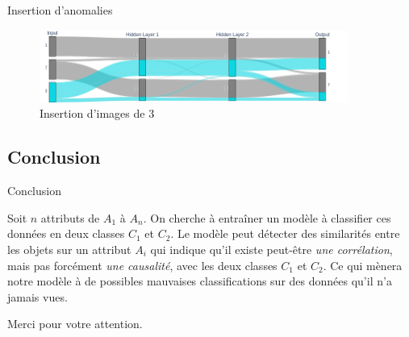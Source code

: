 \documentclass[10pt,handout]{beamer}
\begin{document}
\begin{frame}{Insertion d’anomalies}
    \begin{figure}[h]
        \centering
        \includegraphics[width=0.9\textwidth]{img/anomalie3_sankey.png}
        \caption{Insertion d’images de 3}
    \end{figure}
\end{frame}

\subsection{Conclusion}
\begin{frame}{Conclusion}
    \begin{block}{}
        Soit $n$ attributs de $A_1$ à $A_n$. On cherche à entraîner un modèle à classifier ces données en deux classes $C_1$ et $C_2$. Le modèle peut détecter des similarités entre les objets sur un attribut $A_i$ qui indique qu'il existe peut-être \textit{une corrélation}, mais pas forcément \textit{une causalité}, avec les deux classes $C_1$ et $C_2$. Ce qui mènera notre modèle à de possibles mauvaises classifications sur des données qu'il n'a jamais vues.
    \end{block}
\end{frame}


\begin{frame}
    \begin{center}
      Merci pour votre attention.
    \end{center}
\end{frame}
  
\end{document}
